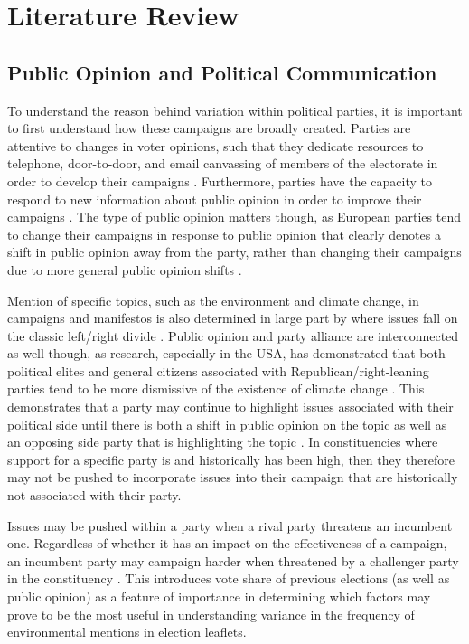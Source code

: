 \documentclass[preprint]{elsarticle} %
\begin{document}
\section{Literature Review}

\subsection{Public Opinion and Political Communication}

To understand the reason behind variation within political parties, it is important to first understand how these campaigns are broadly created. Parties are attentive to changes in voter opinions, such that they dedicate resources to telephone, door-to-door, and email canvassing of members of the electorate in order to develop their campaigns \citep{fisherFootsloggingCallCentres2008}. Furthermore, parties have the capacity to respond to new information about public opinion in order to improve their campaigns \citep{hartmanLearningJobAdapting2017}. The type of public opinion matters though, as European parties tend to change their campaigns in response to public opinion that clearly denotes a shift in public opinion away from the party, rather than changing their campaigns due to more general public opinion shifts \citep{adamsUnderstandingChangeStability2004}. 

Mention of specific topics, such as the environment and climate change, in campaigns and manifestos is also determined in large part by where issues fall on the classic left/right divide \citep{farstadWhatExplainsVariation2018}. Public opinion and party alliance are interconnected as well though, as research, especially in the USA, has demonstrated that both political elites and general citizens associated with Republican/right-leaning parties tend to be more dismissive of the existence of climate change  \citep{dunlapPoliticalDivideClimate2016,mccrightPoliticizationClimateChange2011}. This demonstrates that a party may continue to highlight issues associated with their political side until there is both a shift in public opinion on the topic as well as an opposing side party that is highlighting the topic \citep{carterPartyPoliticizationEnvironment2006}. In constituencies where support for a specific party is and historically has been high, then they therefore may not be pushed to incorporate issues into their campaign that are historically not associated with their party. 

Issues may be pushed within a party when a rival party threatens an incumbent one. Regardless of whether it has an impact on the effectiveness of a campaign, an incumbent party may campaign harder when threatened by a challenger party in the constituency \citep{pattieIncumbentPartiesIncumbent2017a}. This introduces vote share of previous elections (as well as public opinion) as a feature of importance in determining which factors may prove to be the most useful in understanding variance in the frequency of environmental mentions in election leaflets.
\end{document}
